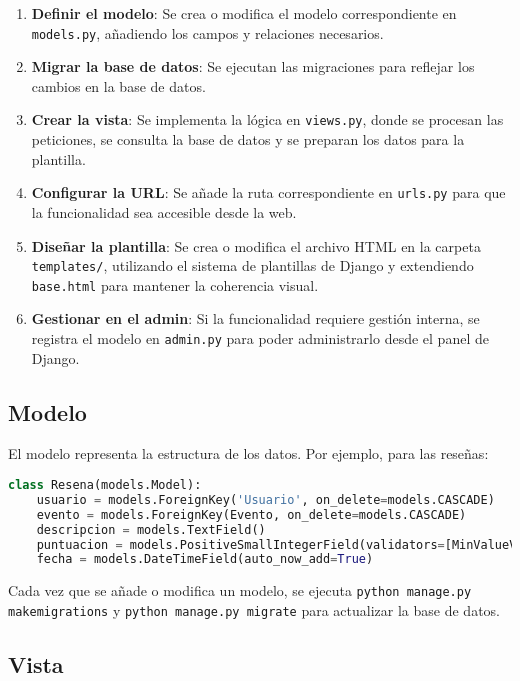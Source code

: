 \begin{enumerate}
    \item \textbf{Definir el modelo}: Se crea o modifica el modelo correspondiente en \texttt{models.py}, añadiendo los campos y relaciones necesarios.
    \item \textbf{Migrar la base de datos}: Se ejecutan las migraciones para reflejar los cambios en la base de datos.
    \item \textbf{Crear la vista}: Se implementa la lógica en \texttt{views.py}, donde se procesan las peticiones, se consulta la base de datos y se preparan los datos para la plantilla.
    \item \textbf{Configurar la URL}: Se añade la ruta correspondiente en \texttt{urls.py} para que la funcionalidad sea accesible desde la web.
    \item \textbf{Diseñar la plantilla}: Se crea o modifica el archivo HTML en la carpeta \texttt{templates/}, utilizando el sistema de plantillas de Django y extendiendo \texttt{base.html} para mantener la coherencia visual.
    \item \textbf{Gestionar en el admin}: Si la funcionalidad requiere gestión interna, se registra el modelo en \texttt{admin.py} para poder administrarlo desde el panel de Django.
\end{enumerate}

\subsection{Modelo}

El modelo representa la estructura de los datos. Por ejemplo, para las reseñas:

\begin{lstlisting}[language=Python, caption={Modelo de Reseña}]
class Resena(models.Model):
    usuario = models.ForeignKey('Usuario', on_delete=models.CASCADE)
    evento = models.ForeignKey(Evento, on_delete=models.CASCADE)
    descripcion = models.TextField()
    puntuacion = models.PositiveSmallIntegerField(validators=[MinValueValidator(0), MaxValueValidator(5)])
    fecha = models.DateTimeField(auto_now_add=True)
\end{lstlisting}

Cada vez que se añade o modifica un modelo, se ejecuta \texttt{python manage.py makemigrations} y \texttt{python manage.py migrate} para actualizar la base de datos.

\subsection{Vista}

